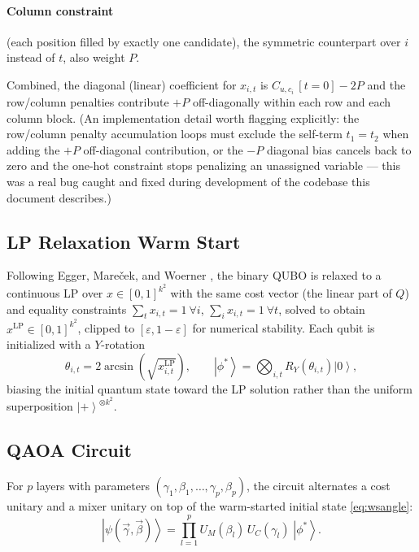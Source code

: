 \documentclass[11pt]{article}
\newcommand{\ket}[1]{\left|#1\right\rangle}
\begin{document}
\paragraph{Column constraint} (each position filled by exactly one candidate), the symmetric counterpart over $i$ instead of $t$, also weight $P$.

Combined, the diagonal (linear) coefficient for $x_{i,t}$ is $C_{u,c_i}\,[t{=}0] - 2P$ and the row/column penalties contribute $+P$ off-diagonally within each row and each column block. (An implementation detail worth flagging explicitly: the row/column penalty accumulation loops must exclude the self-term $t_1 = t_2$ when adding the $+P$ off-diagonal contribution, or the $-P$ diagonal bias cancels back to zero and the one-hot constraint stops penalizing an unassigned variable — this was a real bug caught and fixed during development of the codebase this document describes.)

\subsection{LP Relaxation Warm Start}
\label{sec:hybrid-warmstart}

Following Egger, Mareček, and Woerner \cite{egger2021warmstarting}, the binary QUBO is relaxed to a continuous LP over $x \in [0,1]^{k^2}$ with the same cost vector (the linear part of $Q$) and equality constraints $\sum_t x_{i,t} = 1\ \forall i$, $\sum_i x_{i,t} = 1\ \forall t$, solved to obtain $x^{\mathrm{LP}} \in [0,1]^{k^2}$, clipped to $[\varepsilon, 1-\varepsilon]$ for numerical stability. Each qubit is initialized with a $Y$-rotation
\begin{equation}
  \theta_{i,t} = 2\arcsin\!\left(\sqrt{x^{\mathrm{LP}}_{i,t}}\right), \qquad \ket{\phi^*} = \bigotimes_{i,t} R_Y(\theta_{i,t})\ket{0},
  \label{eq:wsangle}
\end{equation}
biasing the initial quantum state toward the LP solution rather than the uniform superposition $\ket{+}^{\otimes k^2}$.

\subsection{QAOA Circuit}
\label{sec:hybrid-circuit}

For $p$ layers with parameters $(\gamma_1,\beta_1,\dots,\gamma_p,\beta_p)$, the circuit alternates a cost unitary and a mixer unitary on top of the warm-started initial state \eqref{eq:wsangle}:
\begin{equation}
  \ket{\psi(\vec\gamma,\vec\beta)} = \prod_{l=1}^{p} U_M(\beta_l)\,U_C(\gamma_l)\; \ket{\phi^*}.
\end{equation}
\end{document}
